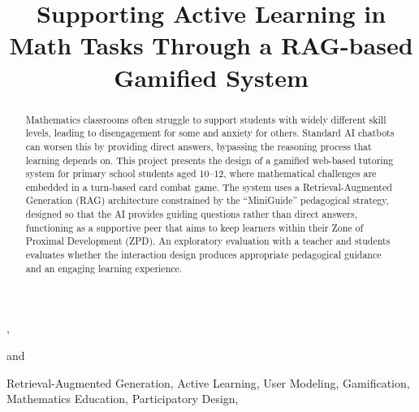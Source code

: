\documentclass{IOS-Book-Article}
\def\hb{\hbox to 11.5 cm{}}
\begin{document}
\pagestyle{headings}
\def\thepage{}
\begin{frontmatter}


    \title{Supporting Active Learning in Math Tasks Through a RAG-based Gamified System}

    \markboth{}{DAIS 2026\hb}


    \author[A]{ },
    \author[A]{ }
    and
    \author[A]{ }

    \address[A]{Master's Programme in Artificial Intelligence, 2025}

    \begin{abstract}
        Mathematics classrooms often struggle to support students with widely different skill levels, leading to disengagement for some and anxiety for others. Standard AI chatbots can worsen this by providing direct answers, bypassing the reasoning process that learning depends on. This project presents the design of a gamified web-based tutoring system for primary school students aged 10--12, where mathematical challenges are embedded in a turn-based card combat game. The system uses a Retrieval-Augmented Generation (RAG) architecture constrained by the \enquote{MiniGuide} pedagogical strategy, designed so that the AI provides guiding questions rather than direct answers, functioning as a supportive peer that aims to keep learners within their Zone of Proximal Development (ZPD). An exploratory evaluation with a teacher and students evaluates whether the interaction design produces appropriate pedagogical guidance and an engaging learning experience.
    \end{abstract}

    \begin{keyword}
        Retrieval-Augmented Generation\sep
        Active Learning\sep
        User Modeling\sep
        Gamification\sep
        Mathematics Education\sep
        Participatory Design\sep
    \end{keyword}

\end{frontmatter}

\markboth{March 2026\hb}{March 2026\hb}

\thispagestyle{empty}
\pagestyle{empty}










\newpage



\end{document}
